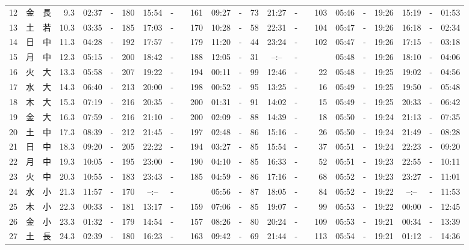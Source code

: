 \documentclass[12pt,a4j]{jsarticle}
\begin{document}
\begin{table}[htbp]
\begin{center}
{\begin{tabular}{|rc|cr|ccrccr|ccrccr|ccc|ccc|}
12 & 金 & 長 &  9.3 &  02:37 &-& 180 &  15:54 &-& 161 &  09:27 &-&  73 &  21:27 &-& 103 & 05:46 & -& 19:26 & 15:19 & -& 01:53 \\
13 & 土 & 若 & 10.3 &  03:35 &-& 185 &  17:03 &-& 170 &  10:28 &-&  58 &  22:31 &-& 104 & 05:47 & -& 19:26 & 16:18 & -& 02:34 \\
14 & 日 & 中 & 11.3 &  04:28 &-& 192 &  17:57 &-& 179 &  11:20 &-&  44 &  23:24 &-& 102 & 05:47 & -& 19:26 & 17:15 & -& 03:18 \\
15 & 月 & 中 & 12.3 &  05:15 &-& 200 &  18:42 &-& 188 &  12:05 &-&  31 &  --:-- &-&~~~~~ & 05:48 & -& 19:26 & 18:10 & -& 04:06 \\
16 & 火 & 大 & 13.3 &  05:58 &-& 207 &  19:22 &-& 194 &  00:11 &-&  99 &  12:46 &-&  22 & 05:48 & -& 19:25 & 19:02 & -& 04:56 \\
17 & 水 & 大 & 14.3 &  06:40 &-& 213 &  20:00 &-& 198 &  00:52 &-&  95 &  13:25 &-&  16 & 05:49 & -& 19:25 & 19:50 & -& 05:48 \\
18 & 木 & 大 & 15.3 &  07:19 &-& 216 &  20:35 &-& 200 &  01:31 &-&  91 &  14:02 &-&  15 & 05:49 & -& 19:25 & 20:33 & -& 06:42 \\
19 & 金 & 大 & 16.3 &  07:59 &-& 216 &  21:10 &-& 200 &  02:09 &-&  88 &  14:39 &-&  18 & 05:50 & -& 19:24 & 21:13 & -& 07:35 \\
20 & 土 & 中 & 17.3 &  08:39 &-& 212 &  21:45 &-& 197 &  02:48 &-&  86 &  15:16 &-&  26 & 05:50 & -& 19:24 & 21:49 & -& 08:28 \\
21 & 日 & 中 & 18.3 &  09:20 &-& 205 &  22:22 &-& 194 &  03:27 &-&  85 &  15:54 &-&  37 & 05:51 & -& 19:24 & 22:23 & -& 09:20 \\
22 & 月 & 中 & 19.3 &  10:05 &-& 195 &  23:00 &-& 190 &  04:10 &-&  85 &  16:33 &-&  52 & 05:51 & -& 19:23 & 22:55 & -& 10:11 \\
23 & 火 & 中 & 20.3 &  10:55 &-& 183 &  23:43 &-& 185 &  04:59 &-&  86 &  17:16 &-&  68 & 05:52 & -& 19:23 & 23:27 & -& 11:01 \\
24 & 水 & 小 & 21.3 &  11:57 &-& 170 &  --:-- &-&~~~~~ &  05:56 &-&  87 &  18:05 &-&  84 & 05:52 & -& 19:22 & --:-- & -& 11:53 \\
25 & 木 & 小 & 22.3 &  00:33 &-& 181 &  13:17 &-& 159 &  07:06 &-&  85 &  19:07 &-&  99 & 05:53 & -& 19:22 & 00:00 & -& 12:45 \\
26 & 金 & 小 & 23.3 &  01:32 &-& 179 &  14:54 &-& 157 &  08:26 &-&  80 &  20:24 &-& 109 & 05:53 & -& 19:21 & 00:34 & -& 13:39 \\
27 & 土 & 長 & 24.3 &  02:39 &-& 180 &  16:23 &-& 163 &  09:42 &-&  69 &  21:44 &-& 113 & 05:54 & -& 19:21 & 01:12 & -& 14:36 \\

\end{tabular}}
\end{center}
\end{table}
\end{document}
